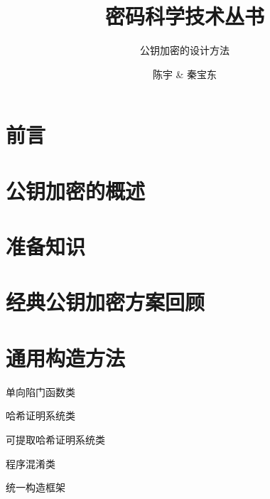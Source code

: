 \documentclass[lang=cn, cm, 10pt, scheme=chinese, bibend=bibtex, citestyle=alphabetic, bibstyle=alphabetic]{elegantbook}
\title{密码科学技术丛书}
\subtitle{公钥加密的设计方法}
\author{陈宇 \& 秦宝东}
\institute{山东大学 \& 西安邮电大学}
\date{}
\begin{document}
\maketitle

\frontmatter

\tableofcontents


\mainmatter

\chapter*{前言}\normalsize


\chapter{公钥加密的概述}



\chapter{准备知识}







\chapter{经典公钥加密方案回顾}




\chapter{通用构造方法}
\begin{introduction}
  \item 单向陷门函数类
  \item 哈希证明系统类
  \item 可提取哈希证明系统类
  \item 程序混淆类
  \item 统一构造框架
\end{introduction}





\end{document}
